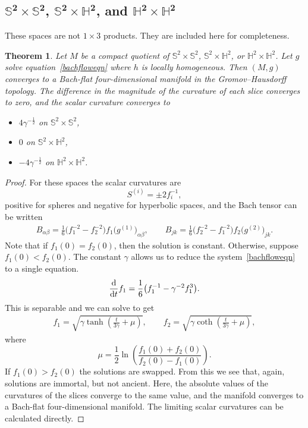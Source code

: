 \documentclass[10pt,a4paper]{amsart}
\numberwithin{equation}{section}
\newtheorem{Theorem}{Theorem}[section]
\newcommand{\dtime}{\frac{{\rm d}}{{\rm d} t}} %
\begin{document}
\subsection[$\mathbb{S}^2 \times \mathbb{S}^2$, $\mathbb{S}^2 \times \mathbb{H}^2$, and $\mathbb{H}^2 \times \mathbb{H}^2$]{$\boldsymbol{\mathbb{S}^2 \times \mathbb{S}^2}$, $\boldsymbol{\mathbb{S}^2 \times \mathbb{H}^2}$, and $\boldsymbol{\mathbb{H}^2 \times \mathbb{H}^2}$}

These spaces are not $1 \times 3$ products. They are included here for completeness.

\begin{Theorem}Let $M$ be a compact quotient of $\mathbb{S}^2 \times \mathbb{S}^2$, $\mathbb{S}^2 \times \mathbb{H}^2$, or $\mathbb{H}^2 \times \mathbb{H}^2$. Let $g$ solve equation~\eqref{bachfloweqn} where $h$ is locally homogeneous. Then $(M, g)$ converges to a Bach-flat four-dimensional manifold in the Gromov--Hausdorff topology. The difference in the magnitude of the curvature of each slice converges to zero, and the scalar curvature converges to
\begin{itemize}\itemsep=0pt
\item $4 \gamma^{-\frac{1}{2}}$ on $\mathbb{S}^2 \times \mathbb{S}^2$,
\item $0$ on $\mathbb{S}^2 \times \mathbb{H}^2$,
\item $-4 \gamma^{-\frac{1}{2}}$ on $\mathbb{H}^2 \times \mathbb{H}^2$.
\end{itemize}
\end{Theorem}

\begin{proof}For these spaces the scalar curvatures are
\[
S^{(i)} = \pm 2 f_i^{-1},
\]
positive for spheres and negative for hyperbolic spaces, and the Bach tensor can be written
\begin{gather*}
B_{\alpha \beta} = \frac{1}{6} \big(f_1^{-2} - f_2^{-2}\big) f_1 \big(g^{(1)}\big)_{\alpha \beta}, \qquad
B_{jk} = \frac{1}{6} \big(f_2^{-2} - f_1^{-2}\big) f_2 \big(g^{(2)}\big)_{jk}.
\end{gather*}
Note that if $f_1(0) = f_2(0)$, then the solution is constant. Otherwise, suppose $f_1(0) < f_2(0)$. The constant $\gamma$ allows us to reduce the system~\eqref{bachfloweqn} to a single equation.
\[
\dtime f_1 = \frac{1}{6}\big(f_1^{-1} - \gamma^{-2} f_1^3\big).
\]
This is separable and we can solve to get
\begin{gather*}
f_1 = \sqrt{\gamma \tanh \left(\frac{t}{3\gamma} + \mu \right)},\qquad
f_2 = \sqrt{\gamma \coth \left(\frac{t}{3\gamma} + \mu \right)},
\end{gather*}
where
\[
\mu = \frac{1}{2} \ln \left(\frac{f_1(0) + f_2(0)}{f_2(0) - f_1(0)} \right).
\]
If $f_1(0) > f_2(0)$ the solutions are swapped. From this we see that, again, solutions are immortal, but not ancient. Here, the absolute values of the curvatures of the slices converge to the same value, and the manifold converges to a Bach-flat four-dimensional manifold. The limiting scalar curvatures can be calculated directly.
\end{proof}
\end{document}

